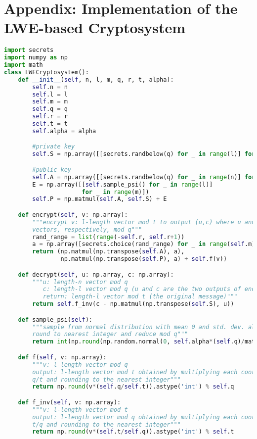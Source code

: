 \section{Appendix: Implementation of the LWE-based Cryptosystem}\label{sec:appendix}
\begin{lstlisting}[language=Python]
import secrets
import numpy as np
import math
class LWECryptosystem():
    def __init__(self, n, l, m, q, r, t, alpha):
        self.n = n
        self.l = l
        self.m = m
        self.q = q
        self.r = r
        self.t = t
        self.alpha = alpha

        #private key
        self.S = np.array([[secrets.randbelow(q) for _ in range(l)] for _ in range(n)])

        #public key
        self.A = np.array([[secrets.randbelow(q) for _ in range(n)] for _ in range(m)])
        E = np.array([[self.sample_psi() for _ in range(l)]
                      for _ in range(m)])
        self.P = np.matmul(self.A, self.S) + E

    def encrypt(self, v: np.array):
        """encrypt v: l-length vector mod t to output (u,c) where u and c are n and l length
        vectors, respectively, mod q"""
        rand_range = list(range(-self.r, self.r+1))
        a = np.array([secrets.choice(rand_range) for _ in range(self.m)])
        return (np.matmul(np.transpose(self.A), a),
                np.matmul(np.transpose(self.P), a) + self.f(v))

    def decrypt(self, u: np.array, c: np.array):
        """u: length-n vector mod q
           c: length-l vector mod q (u and c are the two outputs of encrypt)
           return: length-l vector mod t (the original message)"""
        return self.f_inv(c - np.matmul(np.transpose(self.S), u))

    def sample_psi(self):
        """sample from normal distribution with mean 0 and std. dev. alpha*q/sqrt(2pi),
        round to nearest integer and reduce mod q"""
        return int(np.round(np.random.normal(0, self.alpha*(self.q)/math.sqrt(2*math.pi)))) % self.q

    def f(self, v: np.array):
        """v: l-length vector mod q
        output: l-length vector mod t obtained by multiplying each coordinate of v by
        q/t and rounding to the nearest integer"""
        return np.round(v*(self.q/self.t)).astype('int') % self.q

    def f_inv(self, v: np.array):
        """v: l-length vector mod t
        output: l-length vector mod q obtained by multiplying each coordinate of v by
        t/q and rounding to the nearest integer"""
        return np.round(v*(self.t/self.q)).astype('int') % self.t



\end{lstlisting}
